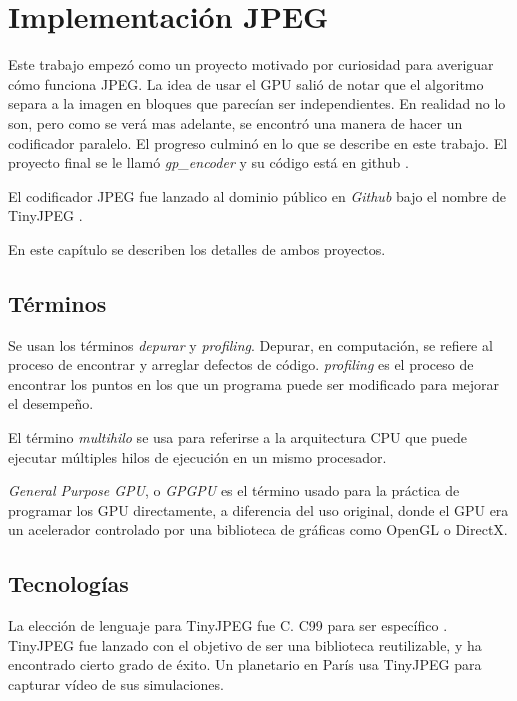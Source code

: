\chapter{Implementación JPEG}\label{ch:implementacion}

Este trabajo empezó como un proyecto motivado por curiosidad para averiguar
cómo funciona JPEG. La idea de usar el GPU salió de notar que el algoritmo
separa a la imagen en bloques que parecían ser independientes. En realidad no
lo son, pero como se verá mas adelante, se encontró una manera de hacer un
codificador paralelo. El progreso culminó en lo que se describe en este
trabajo. El proyecto final se le llamó \emph{gp\_encoder} y su código está en
github \cite{gp_encoder}.

El codificador JPEG fue lanzado al dominio público en \emph{ Github } bajo el
nombre de TinyJPEG \cite{tiny_jpeg}.

En este capítulo se describen los detalles de ambos proyectos.

\section {Términos}

Se usan los términos \emph{\gls{depurar}} y
\emph{\gls{profiling}}. Depurar, en computación, se refiere al proceso de
encontrar y arreglar defectos de código. \emph{profiling} es el proceso de
encontrar los puntos en los que un programa puede ser modificado para mejorar
el desempeño.

El término \emph{multihilo} se usa para referirse a la arquitectura CPU que
puede ejecutar múltiples hilos de ejecución en un mismo procesador.

\emph{General Purpose GPU}, o \emph{\gls{GPGPU}} es el término usado para la
práctica de programar los GPU directamente, a diferencia del uso original, donde
el GPU era un acelerador controlado por una biblioteca de gráficas como OpenGL
o DirectX.

\section{Tecnologías}

La elección de lenguaje para TinyJPEG fue C. C99 para ser específico
\cite{c99}. TinyJPEG fue lanzado con el objetivo de ser una biblioteca
reutilizable, y ha encontrado cierto grado de éxito. Un planetario en París usa
TinyJPEG para capturar vídeo de sus simulaciones.

